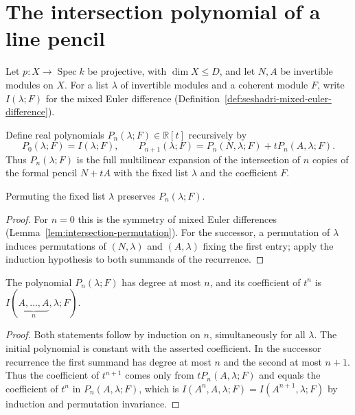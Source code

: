 \section{The intersection polynomial of a line pencil}

Let $p:X\to\operatorname{Spec}k$ be projective, with $\dim X\leq D$, and let $N,A$ be
invertible modules on $X$. For a list $\lambda$ of invertible modules and a coherent module
$F$, write $I(\lambda;F)$ for the mixed Euler difference
(Definition~\ref{def:seshadri-mixed-euler-difference}).

\begin{definition}
\label{def:nef-ample-original-pencil-polynomial}
\leanok
{}
Define real polynomials $P_n(\lambda;F)\in\mathbb R[t]$ recursively by
\[
 P_0(\lambda;F)=I(\lambda;F),\qquad
 P_{n+1}(\lambda;F)=P_n(N,\lambda;F)+tP_n(A,\lambda;F).
\]
Thus $P_n(\lambda;F)$ is the full multilinear expansion of the intersection of $n$ copies of
the formal pencil $N+tA$ with the fixed list $\lambda$ and the coefficient $F$.
\end{definition}

\begin{lemma}
\label{lem:nef-ample-original-pencil-permutation}
\leanok
{}
Permuting the fixed list $\lambda$ preserves $P_n(\lambda;F)$.
\end{lemma}
\begin{proof}
For $n=0$ this is the symmetry of mixed Euler differences
(Lemma~\ref{lem:intersection-permutation}). For the successor, a permutation of $\lambda$
induces permutations of $(N,\lambda)$ and $(A,\lambda)$ fixing the first entry; apply the
induction hypothesis to both summands of the recurrence.
\end{proof}

\begin{lemma}
\label{lem:nef-ample-original-pencil-top-coefficient}
\leanok
{}
The polynomial $P_n(\lambda;F)$ has degree at most $n$, and its coefficient of $t^n$ is
$I(\underbrace{A,\ldots,A}_{n},\lambda;F)$.
\end{lemma}
\begin{proof}
Both statements follow by induction on $n$, simultaneously for all $\lambda$. The initial
polynomial is constant with the asserted coefficient. In the successor recurrence the first
summand has degree at most $n$ and the second at most $n+1$. Thus the coefficient of
$t^{n+1}$ comes only from $tP_n(A,\lambda;F)$ and equals the coefficient of $t^n$ in
$P_n(A,\lambda;F)$, which is $I(A^n,A,\lambda;F)=I(A^{n+1},\lambda;F)$ by induction and
permutation invariance.
\end{proof}


